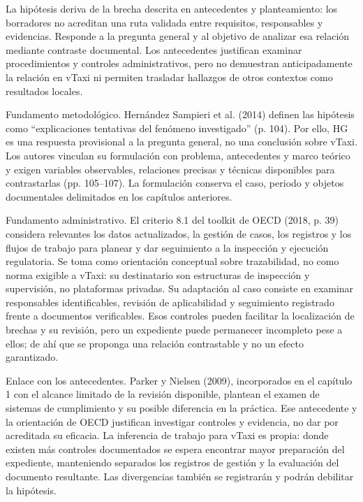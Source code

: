 {La hipótesis deriva de la brecha descrita en antecedentes y planteamiento: los borradores no acreditan una ruta validada entre requisitos, responsables y evidencias. Responde a la pregunta general y al objetivo de analizar esa relación mediante contraste documental. Los antecedentes justifican examinar procedimientos y controles administrativos, pero no demuestran anticipadamente la relación en vTaxi ni permiten trasladar hallazgos de otros contextos como resultados locales.


Fundamento metodológico. Hernández Sampieri et al. (2014) definen las hipótesis como “explicaciones tentativas del fenómeno investigado” (p. 104). Por ello, HG es una respuesta provisional a la pregunta general, no una conclusión sobre vTaxi. Los autores vinculan su formulación con problema, antecedentes y marco teórico y exigen variables observables, relaciones precisas y técnicas disponibles para contrastarlas (pp. 105–107). La formulación conserva el caso, periodo y objetos documentales delimitados en los capítulos anteriores.


Fundamento administrativo. El criterio 8.1 del toolkit de OECD (2018, p. 39) considera relevantes los datos actualizados, la gestión de casos, los registros y los flujos de trabajo para planear y dar seguimiento a la inspección y ejecución regulatoria. Se toma como orientación conceptual sobre trazabilidad, no como norma exigible a vTaxi: su destinatario son estructuras de inspección y supervisión, no plataformas privadas. Su adaptación al caso consiste en examinar responsables identificables, revisión de aplicabilidad y seguimiento registrado frente a documentos verificables. Esos controles pueden facilitar la localización de brechas y su revisión, pero un expediente puede permanecer incompleto pese a ellos; de ahí que se proponga una relación contrastable y no un efecto garantizado.


Enlace con los antecedentes. Parker y Nielsen (2009), incorporados en el capítulo 1 con el alcance limitado de la revisión disponible, plantean el examen de sistemas de cumplimiento y su posible diferencia en la práctica. Ese antecedente y la orientación de OECD justifican investigar controles y evidencia, no dar por acreditada su eficacia. La inferencia de trabajo para vTaxi es propia: donde existen más controles documentados se espera encontrar mayor preparación del expediente, manteniendo separados los registros de gestión y la evaluación del documento resultante. Las divergencias también se registrarán y podrán debilitar la hipótesis.


}

